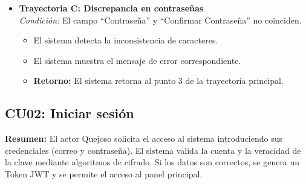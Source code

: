 \begin{appendices}
\begin{itemize}[leftmargin=*]
    \item \textbf{Trayectoria C: Discrepancia en contraseñas} \\
    \textit{Condición:} El campo ``Contraseña'' y ``Confirmar Contraseña'' no coinciden.
    \begin{itemize}[nosep]
        \item[C-1:] El sistema detecta la inconsistencia de caracteres.
        \item[C-2:] El sistema muestra el mensaje de error correspondiente.
        \item \textbf{Retorno:} El sistema retorna al punto 3 de la trayectoria principal.
    \end{itemize}
\end{itemize}

\subsection{CU02: Iniciar sesión}

\textbf{Resumen:} 
El actor Quejoso solicita el acceso al sistema introduciendo sus credenciales (correo y contraseña). El sistema valida la cuenta y la veracidad de la clave mediante algoritmos de cifrado. Si los datos son correctos, se genera un Token JWT y se permite el acceso al panel principal.


\end{appendices}
